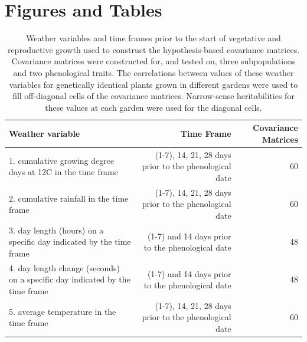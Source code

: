 \documentclass[
  9pt,
  twocolumn,
  twoside]{simple-article}%
\begin{document}
\section{Figures and Tables}\label{figures-and-tables}

\clearpage
\onecolumn
\begin{table}[t!]
\centering
\caption{Weather variables and time frames prior to the start of vegetative and reproductive growth used to construct the hypothesis-based covariance matrices. Covariance matrices were constructed for, and tested on, three subpopulations and two phenological traits. The correlations between values of these weather variables for genetically identical plants grown in different gardens were used to fill off-diagonal cells of the covariance matrices. Narrow-sense heritabilities for these values at each garden were used for the diagonal cells.}
\begin{tabular}{lrr}
Weather variable & Time Frame & Covariance Matrices \\
\midrule
1. cumulative growing degree days at 12C in the time frame & (1-7), 14, 21, 28 days prior to the phenological date & 60 \\
2. cumulative rainfall in the time frame & (1-7), 14, 21, 28 days prior to the phenological date & 60  \\
3. day length (hours) on a specific day indicated by the time frame & (1-7) and 14 days prior to the phenological date & 48 \\
4. day length change (seconds) on a specific day indicated by the time frame & (1-7) and 14 days prior to the phenological date & 48 \\
5. average temperature in the time frame & (1-7), 14, 21, 28 days prior to the phenological date & 60 \\
\bottomrule
\end{tabular}

\end{table}
\clearpage
\twocolumn
\end{document}
